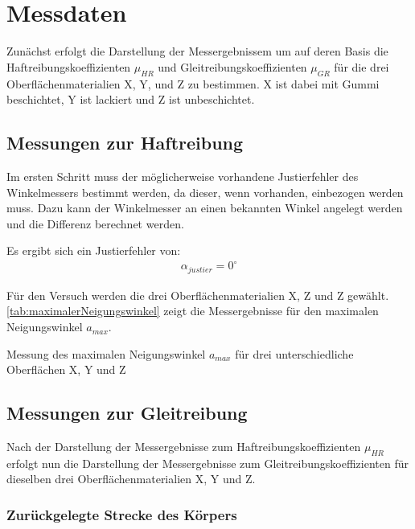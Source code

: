 \section{Messdaten}

Zunächst erfolgt die Darstellung der Messergebnissem um auf deren Basis die Haftreibungskoeffizienten $\mu_{HR}$ und Gleitreibungskoeffizienten $\mu_{GR}$ für die drei Oberflächenmaterialien X, Y, und Z zu bestimmen. X ist dabei mit Gummi beschichtet, Y ist lackiert und Z ist unbeschichtet.

\subsection{Messungen zur Haftreibung} \label{chap:MessungHaftreibung}

Im ersten Schritt muss der möglicherweise vorhandene Justierfehler des Winkelmessers bestimmt werden, da dieser, wenn vorhanden, einbezogen werden muss. Dazu kann der Winkelmesser an einen bekannten Winkel angelegt werden und die Differenz berechnet werden. 

Es ergibt sich ein Justierfehler von:
\begin{align*}
    \alpha_{justier} = 0^\circ
\end{align*}

Für den Versuch werden die drei Oberflächenmaterialien X, Z und Z gewählt. \autoref{tab:maximalerNeigungswinkel} zeigt die Messergebnisse für den maximalen Neigungswinkel $a_{max}$.

\begin{table}[h]
    \center
    \caption[Messung des maximalen Neigungswinkel]{Messung des maximalen Neigungswinkel $a_{max}$ für drei unterschiedliche Oberflächen X, Y und Z}
    
    \label{tab:maximalerNeigungswinkel}
\end{table}

\subsection{Messungen zur Gleitreibung}

Nach der Darstellung der Messergebnisse zum Haftreibungskoeffizienten $\mu_{HR}$ erfolgt nun die Darstellung der Messergebnisse zum Gleitreibungskoeffizienten für dieselben drei Oberflächenmaterialien X, Y und Z.

\subsubsection{Zurückgelegte Strecke des Körpers}

